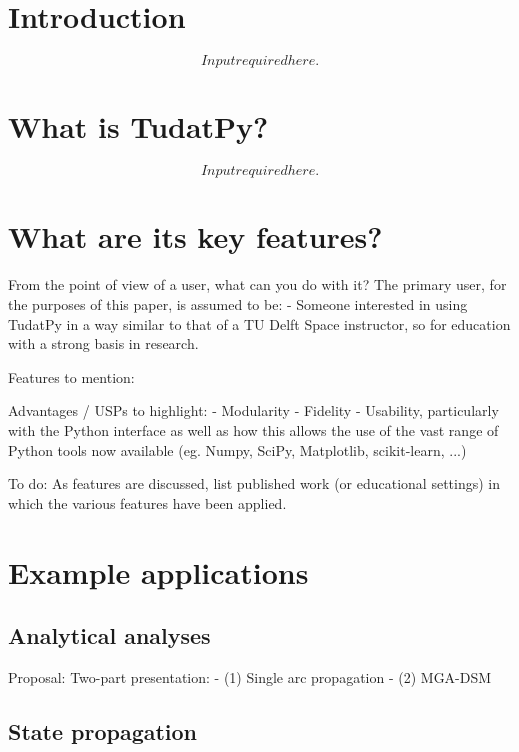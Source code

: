 \documentclass[]{IAC_style}
\begin{document}
\section{Introduction}
    \[Input required here.\]

\section{What is TudatPy?}
    \[Input required here.\]

\section{What are its key features?}

    From the point of view of a user, what can you do with it?
    The primary user, for the purposes of this paper, is assumed to be:
    - Someone interested in using TudatPy in a way similar to that of a TU Delft Space instructor, so for education with a strong basis in research.

    Features to mention:

    Advantages / USPs to highlight:
    - Modularity
    - Fidelity
    - Usability, particularly with the Python interface as well as how this allows the use of the vast range of Python tools now available (eg. Numpy, SciPy, Matplotlib, scikit-learn, ...)

    To do:
    \left[ \right] As features are discussed, list published work (or educational settings) in which the various features have been applied.


\section{Example applications}

    \subsection{Analytical analyses}
    Proposal: Two-part presentation:
    - (1) Single arc propagation
    - (2) MGA-DSM

    \subsection{State propagation}
\end{document}
